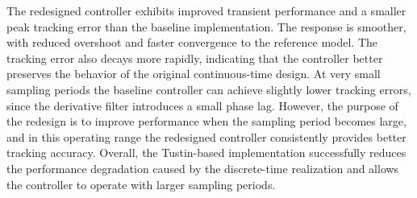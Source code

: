 \noindent The redesigned controller exhibits improved transient performance and
a smaller peak tracking error than the baseline implementation. The response is
smoother, with reduced overshoot and faster convergence to the reference model.
The tracking error also decays more rapidly, indicating that the controller
better preserves the behavior of the original continuous-time design.
At very small sampling periods the baseline controller can achieve slightly
lower tracking errors, since the derivative filter introduces a small phase
lag. However, the purpose of the redesign is to improve performance when the
sampling period becomes large, and in this operating range the redesigned
controller consistently provides better tracking accuracy. Overall, the Tustin-based implementation successfully
reduces the performance degradation caused by the discrete-time realization and
allows the controller to operate with larger sampling periods.

\bigskip